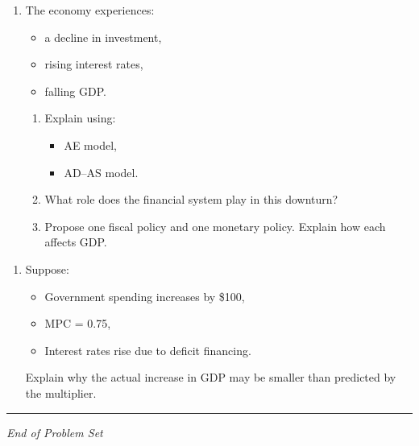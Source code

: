 \documentclass[12pt]{article}
\begin{document}
\begin{enumerate}[label=\textbf{\arabic*.}, start=18]

\item The economy experiences:
\begin{itemize}
    \item a decline in investment,
    \item rising interest rates,
    \item falling GDP.
\end{itemize}

\begin{enumerate}
    \item[(a)] Explain using:
    \begin{itemize}
        \item AE model,
        \item AD--AS model.
    \end{itemize}
    \item[(b)] What role does the financial system play in this downturn?
    \item[(c)] Propose one fiscal policy and one monetary policy. 
    Explain how each affects GDP.
\end{enumerate}

\end{enumerate}



\begin{enumerate}[label=\textbf{\arabic*.}, start=19]

\item Suppose:
\begin{itemize}
    \item Government spending increases by \$100,
    \item MPC = 0.75,
    \item Interest rates rise due to deficit financing.
\end{itemize}

Explain why the actual increase in GDP may be smaller than predicted by the multiplier.

\end{enumerate}

\hrule
\vspace{1em}

\begin{center}
\textit{End of Problem Set}
\end{center}
\end{document}
